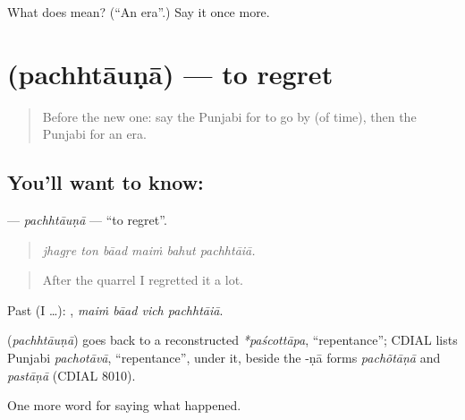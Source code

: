 \begin{tcolorbox}[breakable,colback=teal!4,colframe=teal!35!black,title={Before you move on}]
What does  mean? (\textquotedblleft{}An era\textquotedblright{}.) Say it once more.
\end{tcolorbox}
\section[\texorpdfstring{\pa{ਪਛਤਾਉਣਾ} (pachhtāuṇā)}{ਪਛਤਾਉਣਾ (pachhtāuṇā)}]{ (pachhtāuṇā) — to regret}

\label{lesson:PA-C317-pachhtauna}



\begin{quote}
Before the new one: say the Punjabi for to go by (of time), then the Punjabi for an era.
\end{quote}

\subsection*{You'll want to know: }
\textbf{} — \emph{pachhtāuṇā} — \textquotedblleft{}to regret\textquotedblright{}.

\begin{quote}
     
\end{quote}

\begin{quote}
\emph{jhagṛe ton bāad maiṁ bahut pachhtāiā.}
\end{quote}

\begin{quote}
After the quarrel I regretted it a lot.
\end{quote}

Past (I …):    , \emph{maiṁ bāad vich pachhtāiā}.

\begin{cousinweb}
\textbf{} (\emph{pachhtāuṇā}) goes back to a reconstructed \emph{*paścottāpa}, \textquotedblleft{}repentance\textquotedblright{}; CDIAL lists Punjabi \emph{pachotāvā}, \textquotedblleft{}repentance\textquotedblright{}, under it, beside the -ṇā forms \emph{pachõtāṇā} and \emph{pastāṇā} (CDIAL 8010).
\end{cousinweb}

\begin{grammarlens}[title={What you've built}]
One more word for saying what happened.
\end{grammarlens}

